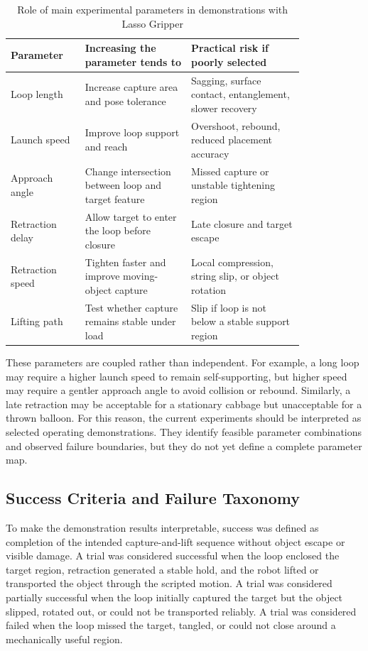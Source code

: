 \begin{table}[htbp]
    \centering
    \caption{Role of main experimental parameters in demonstrations with Lasso Gripper}
    \label{tab:lasso_parameters}
    \begin{tabular}{p{0.20\linewidth} p{0.30\linewidth} p{0.32\linewidth}}
        \toprule
        Parameter & Increasing the parameter tends to & Practical risk if poorly selected \\
        \midrule
        Loop length & Increase capture area and pose tolerance & Sagging, surface contact, entanglement, slower recovery \\
        Launch speed & Improve loop support and reach & Overshoot, rebound, reduced placement accuracy \\
        Approach angle & Change intersection between loop and target feature & Missed capture or unstable tightening region \\
        Retraction delay & Allow target to enter the loop before closure & Late closure and target escape \\
        Retraction speed & Tighten faster and improve moving-object capture & Local compression, string slip, or object rotation \\
        Lifting path & Test whether capture remains stable under load & Slip if loop is not below a stable support region \\
        \bottomrule
    \end{tabular}
\end{table}

These parameters are coupled rather than independent. For example, a long loop may require a higher launch speed to remain self-supporting, but higher speed may require a gentler approach angle to avoid collision or rebound. Similarly, a late retraction may be acceptable for a stationary cabbage but unacceptable for a thrown balloon. For this reason, the current experiments should be interpreted as selected operating demonstrations. They identify feasible parameter combinations and observed failure boundaries, but they do not yet define a complete parameter map.

\subsection{Success Criteria and Failure Taxonomy}
To make the demonstration results interpretable, success was defined as completion of the intended capture-and-lift sequence without object escape or visible damage. A trial was considered successful when the loop enclosed the target region, retraction generated a stable hold, and the robot lifted or transported the object through the scripted motion. A trial was considered partially successful when the loop initially captured the target but the object slipped, rotated out, or could not be transported reliably. A trial was considered failed when the loop missed the target, tangled, or could not close around a mechanically useful region.

